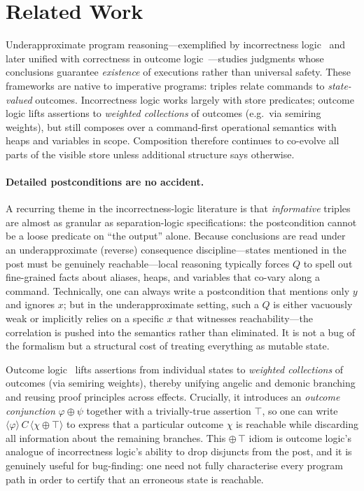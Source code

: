 \section{Related Work}
Underapproximate program reasoning---exemplified by incorrectness
logic~\cite{OHP19} and later unified with correctness in outcome
logic~\cite{ZDS23,Zil25TOPLAS}---studies judgments whose conclusions
guarantee \emph{existence} of executions rather than universal safety.
These frameworks are native to imperative programs: triples relate
commands to \emph{state-valued} outcomes.
Incorrectness logic works largely with store predicates;
outcome logic lifts assertions to \emph{weighted collections} of
outcomes (e.g.\ via semiring weights), but still composes over a
command-first operational semantics with heaps and variables in scope.
Composition therefore continues to co-evolve all parts of the visible
store unless additional structure says otherwise.

\paragraph{Detailed postconditions are no accident.}
A recurring theme in the incorrectness-logic literature is that
\emph{informative} triples are almost as granular as separation-logic
specifications: the postcondition cannot be a loose predicate on
``the output'' alone.
Because conclusions are read under an underapproximate (reverse)
consequence discipline---states mentioned in the post must be
genuinely reachable---local reasoning typically forces $Q$ to spell out
fine-grained facts about aliases, heaps, and variables that co-vary
along a command.
Technically, one can always write a postcondition that mentions only $y$
and ignores $x$; but in the underapproximate setting, such a $Q$ is
either vacuously weak or implicitly relies on a specific $x$ that
witnesses reachability---the correlation is pushed into the semantics
rather than eliminated.
It is not a bug of the formalism but a structural cost of treating
everything as mutable state.

Outcome logic~\cite{ZDS23,Zil25TOPLAS} lifts assertions from individual
states to \emph{weighted collections} of outcomes (via semiring
weights), thereby unifying angelic and demonic branching and reusing
proof principles across effects.
Crucially, it introduces an \emph{outcome conjunction} $\varphi \oplus
\psi$ together with a trivially-true assertion $\top$, so one can write
$\langle \varphi \rangle\, C\, \langle \chi \oplus \top \rangle$ to
express that a particular outcome $\chi$ is reachable while discarding
all information about the remaining branches.
This $\oplus\,\top$ idiom is outcome logic's analogue of incorrectness
logic's ability to drop disjuncts from the post, and it is genuinely
useful for bug-finding: one need not fully characterise every program
path in order to certify that an erroneous state is reachable.

